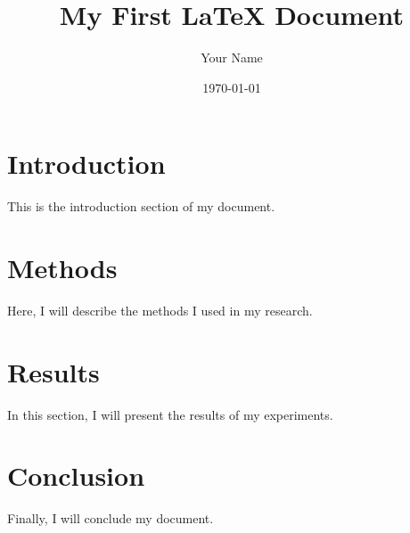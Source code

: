 \documentclass{article}
\begin{document}
\title{My First LaTeX Document}
\author{Your Name}
\date{\today}

\maketitle

\section{Introduction}
This is the introduction section of my document.

\section{Methods}
Here, I will describe the methods I used in my research.

\section{Results}
In this section, I will present the results of my experiments.

\section{Conclusion}
Finally, I will conclude my document.
\end{document}
